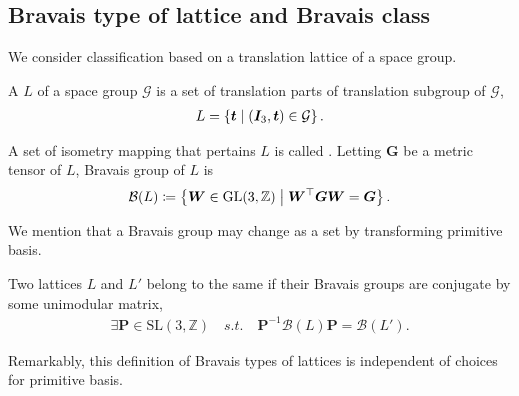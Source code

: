 
\subsection{\label{sec:bravais-class}Bravais type of lattice and Bravais class}

We consider classification based on a translation lattice of a space group.

\begin{screen}
  \begin{definition}
    A  $L$ of a space group $\mathcal{G}$ is a set of translation parts of translation subgroup of $\mathcal{G}$,
    \begin{align}
      L = \left\{  \bm{t}  \mathrel{}\middle|\mathrel{}  (\bm{I}_{3}, \bm{t}) \in \mathcal{G}  \right\}.
    \end{align}
  \end{definition}
\end{screen}

\begin{screen}
  \begin{definition}
    A set of isometry mapping that pertains $L$ is called .
    Letting $\bm{G}$ be a metric tensor of $L$, Bravais group of $L$ is
    \begin{align}
      \mathcal{B}(L) \coloneqq \left\{  \bm{W} \in \mathrm{GL}(3, \mathbb{Z})  \mathrel{}\middle|\mathrel{}  \bm{W}^{\top}\bm{GW} = \bm{G}  \right\}.
    \end{align}
  \end{definition}
\end{screen}

We mention that a Bravais group may change as a set by transforming primitive basis.

\begin{screen}
  \begin{definition}
    Two lattices $L$ and $L'$ belong to the same  if their Bravais groups are conjugate by some unimodular matrix,
    \begin{align}
      \exists \bm{P} \in \mathrm{SL}(3, \mathbb{Z}) \quad s.t. \quad \bm{P}^{-1} \mathcal{B}(L) \bm{P} = \mathcal{B}(L').
    \end{align}
  \end{definition}
\end{screen}
Remarkably, this definition of Bravais types of lattices is independent of choices for primitive basis.

